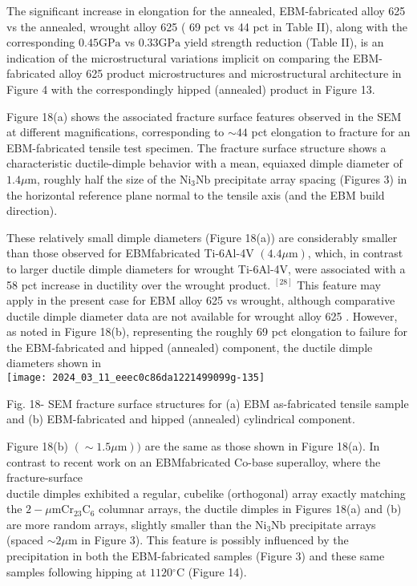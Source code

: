 \documentclass[10pt]{article}
\begin{document}
The significant increase in elongation for the annealed, EBM-fabricated alloy 625 vs the annealed, wrought alloy 625 ( 69 pct vs 44 pct in Table II), along with the corresponding $0.45 \mathrm{GPa}$ vs $0.33 \mathrm{GPa}$ yield strength reduction (Table II), is an indication of the microstructural variations implicit on comparing the EBM-fabricated alloy 625 product microstructures and microstructural architecture in Figure 4 with the correspondingly hipped (annealed) product in Figure 13.

Figure 18(a) shows the associated fracture surface features observed in the SEM at different magnifications, corresponding to $\sim 44$ pct elongation to fracture for an EBM-fabricated tensile test specimen. The fracture surface structure shows a characteristic ductile-dimple behavior with a mean, equiaxed dimple diameter of $1.4 \mu \mathrm{m}$, roughly half the size of the $\mathrm{Ni}_{3} \mathrm{Nb}$ precipitate array spacing (Figures 3) in the horizontal reference plane normal to the tensile axis (and the EBM build direction).

These relatively small dimple diameters (Figure 18(a)) are considerably smaller than those observed for EBMfabricated Ti-6Al-4V $(4.4 \mu \mathrm{m})$, which, in contrast to larger ductile dimple diameters for wrought Ti-6Al-4V, were associated with a 58 pct increase in ductility over the wrought product. ${ }^{[28]}$ This feature may apply in the present case for EBM alloy 625 vs wrought, although comparative ductile dimple diameter data are not available for wrought alloy 625 . However, as noted in Figure 18(b), representing the roughly 69 pct elongation to failure for the EBM-fabricated and hipped (annealed) component, the ductile dimple diameters shown in\\
\texttt{[image: 2024\_03\_11\_eeec0c86da1221499099g-135]}

Fig. 18- SEM fracture surface structures for (a) EBM as-fabricated tensile sample and (b) EBM-fabricated and hipped (annealed) cylindrical component.

Figure 18(b) $(\sim 1.5 \mu \mathrm{m}))$ are the same as those shown in Figure 18(a). In contrast to recent work on an EBMfabricated Co-base superalloy, where the fracture-surface\\
ductile dimples exhibited a regular, cubelike (orthogonal) array exactly matching the $2-\mu \mathrm{m} \mathrm{Cr}_{23} \mathrm{C}_{6}$ columnar arrays, the ductile dimples in Figures 18(a) and (b) are more random arrays, slightly smaller than the $\mathrm{Ni}_{3} \mathrm{Nb}$ precipitate arrays (spaced $\sim 2 \mu \mathrm{m}$ in Figure 3). This feature is possibly influenced by the precipitation in both the EBM-fabricated samples (Figure 3) and these same samples following hipping at $1120{ }^{\circ} \mathrm{C}$ (Figure 14).
\end{document}
